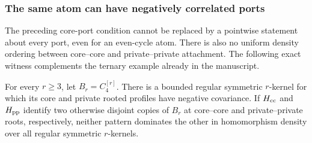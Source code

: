 \subsubsection{The same atom can have negatively correlated ports}

The preceding core-port condition cannot be replaced by a pointwise
statement about every port, even for an even-cycle atom.  There is also
no uniform density ordering between core--core and private--private
attachment.  The following exact witness complements the ternary
example already in the manuscript.

\begin{proposition}
\label{followon-negative-root-correlation}
For every $r\ge3$, let $B_r=C_4^{[r]}$.  There is a bounded regular
symmetric $r$-kernel for which its core and private rooted profiles
have negative covariance.  If $H_{\rm cc}$ and $H_{\rm pp}$ identify
two otherwise disjoint copies of $B_r$ at core--core and
private--private roots, respectively, neither pattern dominates the
other in homomorphism density over all regular symmetric $r$-kernels.
\end{proposition}
